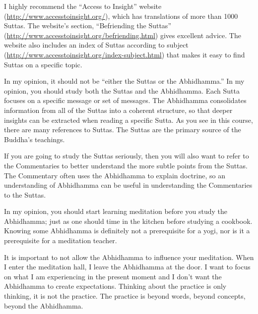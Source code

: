 I highly recommend the “Access to Insight” website (\url{http://www.accesstoinsight.org/}), which has translations of more than 1000 Suttas. The website’s section, “Befriending the Suttas” (\url{http://www.accesstoinsight.org/befriending.html}) gives excellent advice. The website also includes an index of Suttas according to subject (\url{http://www.accesstoinsight.org/index-subject.html}) that makes it easy to find Suttas on a specific topic.


In my opinion, it should not be “either the Suttas or the Abhidhamma.” In my opinion, you should study both the Suttas and the Abhidhamma. Each Sutta focuses on a specific message or set of messages. The Abhidhamma consolidates information from all of the Suttas into a coherent structure, so that deeper insights can be extracted when reading a specific Sutta. As you see in this course, there are many references to Suttas. The Suttas are the primary source of the Buddha’s teachings.

\color{red}

If you are going to study the Suttas seriously, then you will also want to refer to the Commentaries to better understand the more subtle points from the Suttas. The Commentary often uses the Abhidhamma to explain doctrine, so an understanding of Abhidhamma can be useful in understanding the Commentaries to the Suttas.

\color{black}

\pagebreak

\color{red}


In my opinion, you should start learning meditation before you study the Abhidhamma; just as one should time in the kitchen before studying a cookbook. Knowing some Abhidhamma is definitely not a prerequisite for a yogi, nor is it a prerequisite for a meditation teacher.

It is important to not allow the Abhidhamma to influence your meditation. When I enter the meditation hall, I leave the Abhidhamma at the door. I want to focus on what I am experiencing in the present moment and I don’t want the Abhidhamma to create expectations. Thinking about the practice is only thinking, it is not the practice. The practice is beyond words, beyond concepts, beyond the Abhidhamma. 

